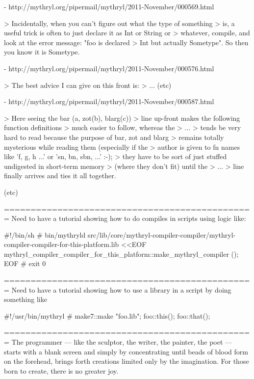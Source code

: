    - http://mythryl.org/pipermail/mythryl/2011-November/000569.html 

    > Incidentally, when you can't figure out what the type of something 
    > is, a useful trick is often to just declare it as Int or String or 
    > whatever, compile, and look at the error message:  "foo is declared 
    > Int but actually Sometype".  So then you know it is Sometype. 

    - http://mythryl.org/pipermail/mythryl/2011-November/000576.html 

    > The best advice I can give on this front is: 
    > ... (etc) 

    - http://mythryl.org/pipermail/mythryl/2011-November/000587.html 

    > Here seeing the   bar (a, zot(b), blarg(c)) 
    > line up-front makes the following function definitions 
    > much easier to follow, whereas the 
    > ... 
    > tends be very hard to read because the purpose of bar, zot and blarg 
    > remains totally mysterious while reading them (especially if the 
    > author is given to fn names like 'f, g, h ...' or 'sn, bn, sbn, ...' :-); 
    > they have to be sort of just stuffed undigested in short-term memory 
    > (where they don't fit) until the 
    > ... 
    > line finally arrives and ties it all together. 

    (etc) 
 


=============================================== 
Need to have a tutorial showing how to do compiles 
in scripts using logic like:

    #!/bin/sh 
    # 
    bin/mythryld  src/lib/core/mythryl-compiler-compiler/mythryl-compiler-compiler-for-this-platform.lib  <<EOF 
        mythryl_compiler_compiler_for_this_platform::make_mythryl_compiler (); 
    EOF 
    # 
    exit 0 


=============================================== 
Need to have a tutorial showing how to use a library 
in a script by doing something like 

    #!/usr/bin/mythryl 
    # 
    make7::make "foo.lib"; 
    { 
        foo::this(); 
        foo::that(); 
    } 



=============================================== 
The programmer --- like the sculptor, the writer, the painter,
the poet --- starts with a blank screen and simply by concentrating 
until beads of blood form on the forehead, brings forth creations 
limited only by the imagination.  For those born to create, there 
is no greater joy.

